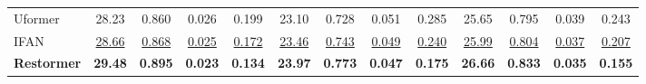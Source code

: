 \documentclass[10pt,twocolumn,letterpaper]{article}
\begin{document}
\begin{table*}[!t]
\begin{center}
{\begin{tabular}{l | c c c c | c c c c | c c c c }
Uformer~\cite{wang2021uformer} & 28.23 & 0.860 & 0.026 & 0.199 & 23.10 & 0.728 & 0.051 & 0.285 & 25.65 & 0.795 & 0.039 & 0.243 \\

IFAN~\cite{Lee_2021_CVPRifan} & \underline{28.66} & \underline{0.868} & \underline{0.025} & \underline{0.172} & \underline{23.46} & \underline{0.743} & \underline{0.049} & \underline{0.240} & \underline{25.99} & \underline{0.804} & \underline{0.037} & \underline{0.207} \\


\textbf{Restormer}& \textbf{29.48}  & \textbf{0.895}  & \textbf{0.023} & \textbf{0.134} & \textbf{23.97}  & \textbf{0.773}  & \textbf{0.047} & \textbf{0.175}  & \textbf{26.66}  & \textbf{0.833}  & \textbf{0.035}  & \textbf{0.155} \\
\bottomrule[0.1em]
\end{tabular}}
\end{center}
\vspace{-1.5em}
\end{table*} 
\end{document}
